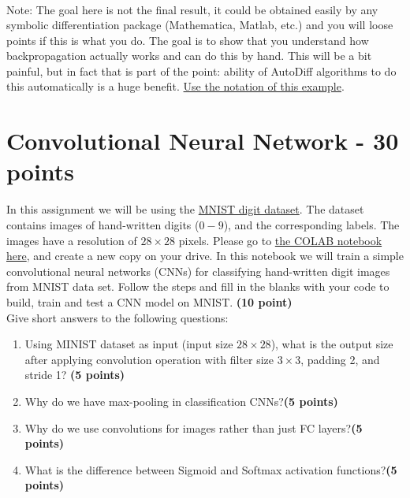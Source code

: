 \documentclass[12pt]{article}
\begin{document}
\begin{enumerate}[label=(\roman*)]
\begin{equation*}
\begin{align*}
\end{align*}
\end{equation*}
\end{enumerate}

Note: The goal here is not the final result, it could be obtained easily by any symbolic differentiation
package (Mathematica, Matlab, etc.) and you will loose points if this is what you do. The goal is to show
that you understand how backpropagation actually works and can do this by hand. This will be a bit painful,
but in fact that is part of the point: ability of AutoDiff algorithms to do this automatically is a huge benefit.  \href{https://canvas.ubc.ca/files/13305822/download?download_frd=1}{Use the notation of this example}.

\section{Convolutional Neural Network - 30 points}
In this assignment we will be using the \href{https://www.tensorflow.org/datasets/catalog/mnist}{MNIST digit dataset}. The dataset contains images of hand-written digits ($0-9$), and the corresponding labels. The images have a resolution of $28\times 28$ pixels.
Please go to \href{https://colab.research.google.com/drive/15QluTY841KoWqVh1CQ3lM6gKrtJvdRGC#scrollTo=_ut4_8RNi1oU}{the COLAB notebook here}, and create a new copy on your drive. In this notebook we will train a simple convolutional neural networks (CNNs) for classifying hand-written digit images from MNIST data set. Follow the steps and fill in the blanks with your code to build, train and test a CNN model on MNIST. \textbf{(10 point)}\\ \newline
\noindent Give short answers to the following questions:

\begin{enumerate}[label=(\roman*)]
\item Using MINIST dataset as input (input size $28 \times 28$), what is the output size after applying convolution operation with filter size $3\times3$, padding 2, and stride 1? \textbf{(5 points)}
\item Why do we have max-pooling in classification CNNs?\textbf{(5 points)}
\item  Why do we use convolutions for images rather than
just FC layers?\textbf{(5 points)}
\item What is the difference between Sigmoid and Softmax activation functions?\textbf{(5 points)}
\end{enumerate}
\end{document}
